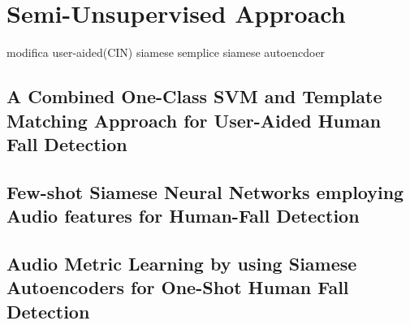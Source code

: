 \chapter{Semi-Unsupervised Approach}
 modifica user-aided(CIN)
siamese semplice
siamese autoencdoer

\section{A Combined One-Class SVM and Template Matching Approach for User-Aided Human Fall Detection}
\section{Few-shot Siamese Neural Networks employing Audio features
for Human-Fall Detection}
\section{Audio Metric Learning by using Siamese Autoencoders
for One-Shot Human Fall Detection}
\label{sec:autoencoder_one_shot}